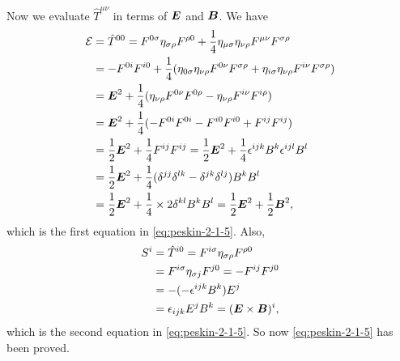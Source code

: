 \documentclass[hyperref, a4paper]{article}
\begin{document}
\begin{itemize}
    Now we evaluate $\hat{T}^{\mu \nu}$ in terms of $\vb*{E}$ and $\vb*{B}$.
    We have
    \[
        \begin{aligned}
            \mathcal{E} &= \hat{T}^{00} = F^{0 \sigma} \eta_{\sigma \rho} F^{\rho 0} + \frac{1}{4} \eta_{\mu \sigma} \eta_{\nu \rho} F^{\mu \nu} F^{\sigma \rho} \\
            &= - F^{0 i} F^{i 0} + \frac{1}{4} (\eta_{0 \sigma} \eta_{\nu \rho} F^{0 \nu} F^{\sigma \rho} + \eta_{i \sigma} \eta_{\nu \rho} F^{i \nu} F^{\sigma \rho}) \\
            &= \vb*{E}^2 + \frac{1}{4} ( \eta_{\nu \rho} F^{0 \nu} F^{0 \rho} - \eta_{\nu \rho} F^{i \nu} F^{i \rho}) \\
            &= \vb*{E}^2 + \frac{1}{4} ( - F^{0 i} F^{0 i} - F^{i 0} F^{i 0} + F^{i j} F^{i j}) \\
            &= \frac{1}{2} \vb*{E}^2 + \frac{1}{4} F^{ij} F^{ij} = \frac{1}{2} \vb*{E}^2 + \frac{1}{4} \epsilon^{ijk} B^k \epsilon^{ijl} B^l \\
            &= \frac{1}{2} \vb*{E}^2 + \frac{1}{4} (\delta^{jj} \delta^{lk} - \delta^{jk} \delta^{lj}) B^k B^l \\
            &= \frac{1}{2} \vb*{E}^2 + \frac{1}{4} \times 2 \delta^{kl} B^k B^l = \frac{1}{2} \vb*{E}^2 + \frac{1}{2} \vb*{B}^2,
        \end{aligned}
    \]
    which is the first equation in \eqref{eq:peskin-2-1-5}.
    Also, 
    \[
        \begin{aligned}
            S^i &= \hat{T}^{i 0} = F^{i \sigma} \eta_{\sigma \rho} F^{\rho 0} \\
            &= F^{i \sigma} \eta_{\sigma j} F^{j 0} = - F^{i j} F^{j 0} \\
            &= - (- \epsilon^{ijk} B^k) E^j \\
            &= \epsilon_{ijk} E^j B^k = (\vb*{E} \times \vb*{B})^i,
        \end{aligned}
    \]
    which is the second equation in \eqref{eq:peskin-2-1-5}.
    So now \eqref{eq:peskin-2-1-5} has been proved.
\end{itemize}
\end{document}
